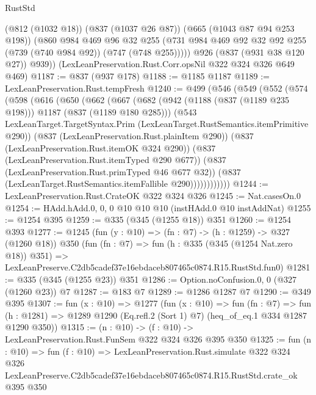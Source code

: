 \begin{lexlean}{RustStd}
\begin{coremodule}
          (@812 (@1032 @18))
          (@837 (@1037 @26 @87))
          (@665 (@1043 @87 @94 @253 @198))
          (@860
            @984
            @469
            @96
            @32
            @255
            (@731 @984 @469 @92 @32 @92 @255 (@739 (@740 @984 @92)) (@747 (@748 @255)))))
        @926
        (@837 (@931 @38 @120 @27))
        @939))
    (LexLeanPreservation.Rust.Corr.opsNil @322 @324 @326 @649 @469)
@1187 := @837 (@937 @178)
@1188 := @1185 @1187
@1189 := LexLeanPreservation.Rust.tempFresh
@1240 := @499
    (@546
      (@549
        (@552
          (@574
            (@598
              (@616
                (@650
                  (@662
                    (@667
                      (@682
                        (@942 (@1188 (@837 (@1189 @235 @198))) @1187 (@837 (@1189 @180 @285)))
                        (@543
                          LexLeanTarget.TargetSyntax.Prim
                          (LexLeanTarget.RustSemantics.itemPrimitive @290))
                        (@837 (LexLeanPreservation.Rust.plainItem @290))
                        (@837 (LexLeanPreservation.Rust.itemOK @324 @290))
                        (@837 (LexLeanPreservation.Rust.itemTyped @290 @677))
                        (@837 (LexLeanPreservation.Rust.primTyped @46 @677 @32))
                        (@837 (LexLeanTarget.RustSemantics.itemFallible @290))))))))))))
@1244 := LexLeanPreservation.Rust.CrateOK @322 @324 @326
@1245 := Nat.casesOn.{0}
@1254 := HAdd.hAdd.{0, 0, 0} @10 @10 @10 (instHAdd.{0} @10 instAddNat)
@1255 := @1254 @395
@1259 := @335 (@345 (@1255 @18)) @351
@1260 := @1254 @393
@1277 := @1245
    (fun (y : @10) => (fn : @7) -> (h : @1259) -> @327 (@1260 @18))
    @350
    (fun (fn : @7) =>
    fun (h : @335 (@345 (@1254 Nat.zero @18)) @351) =>
    LexLeanPreserve.C2db5cadef37e16ebdaceb807465c0874.R15.RustStd.fun0)
@1281 := @335 (@345 (@1255 @23)) @351
@1286 := Option.noConfusion.{0, 0} (@327 (@1260 @23)) @7
@1287 := @183 @7
@1289 := @1286 @1287 @7
@1290 := @349 @395
@1307 := fun (x : @10) =>
  @1277
    (fun (x : @10) =>
    fun (fn : @7) =>
    fun (h : @1281) => @1289 @1290 (Eq.refl.{2} (Sort 1) @7) (heq_of_eq.{1} @334 @1287 @1290 @350))
@1315 := (n : @10) -> (f : @10) -> LexLeanPreservation.Rust.FunSem @322 @324 @326 @395 @350
@1325 := fun (n : @10) =>
  fun (f : @10) =>
  LexLeanPreservation.Rust.simulate
    @322
    @324
    @326
    LexLeanPreserve.C2db5cadef37e16ebdaceb807465c0874.R15.RustStd.crate_ok
    @395
    @350
\end{coremodule}
\end{lexlean}
